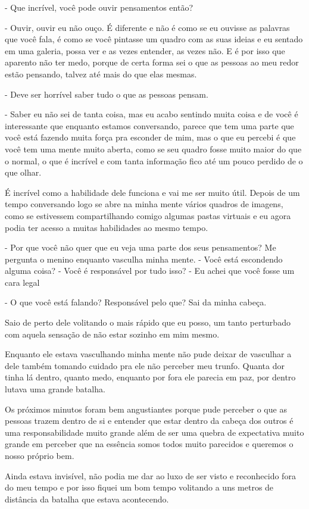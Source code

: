 - Que incrível, você pode ouvir pensamentos então?

- Ouvir, ouvir eu não ouço. É diferente e não é como se eu ouvisse as palavras que você fala, é como se você pintasse um quadro com as suas ideias e eu sentado em uma galeria, possa ver e as vezes entender, as vezes não. E é por isso que aparento não ter medo, porque de certa forma sei o que as pessoas ao meu redor estão pensando, talvez até mais do que elas mesmas.

- Deve ser horrível saber tudo o que as pessoas pensam.

- Saber eu não sei de tanta coisa, mas eu acabo sentindo muita coisa e de você é interessante que enquanto estamos conversando, parece que tem uma parte que você está fazendo muita força pra esconder de mim, mas o que eu percebi é que você tem uma mente muito aberta, como se seu quadro fosse muito maior do que o normal, o que é incrível e com tanta informação fico até um pouco perdido de o que olhar.

É incrível como a habilidade dele funciona e vai me ser muito útil. Depois de um tempo conversando logo se abre na minha mente vários quadros de imagens, como se estivessem compartilhando comigo algumas pastas virtuais e eu agora podia ter acesso a muitas habilidades ao mesmo tempo.

- Por que você não quer que eu veja uma parte dos seus pensamentos? Me pergunta o menino enquanto vasculha minha mente. - Você está escondendo alguma coisa? - Você é responsável por tudo isso? - Eu achei que você fosse um cara legal

- O que você está falando? Responsável pelo que? Sai da minha cabeça.

Saio de perto dele volitando o mais rápido que eu posso, um tanto perturbado com aquela sensação de não estar sozinho em mim mesmo.

Enquanto ele estava vasculhando minha mente não pude deixar de vasculhar a dele também tomando cuidado pra ele não perceber meu trunfo. Quanta dor tinha lá dentro, quanto medo, enquanto por fora ele parecia em paz, por dentro lutava uma grande batalha.

Os próximos minutos foram bem angustiantes porque pude perceber o que as pessoas trazem dentro de si e entender que estar dentro da cabeça dos outros é uma responsabilidade muito grande além de ser uma quebra de expectativa muito grande em perceber que na essência somos todos muito parecidos e queremos o nosso próprio bem.

Ainda estava invisível, não podia me dar ao luxo de ser visto e reconhecido fora do meu tempo e por isso fiquei um bom tempo volitando a uns metros de distância da batalha que estava acontecendo.

